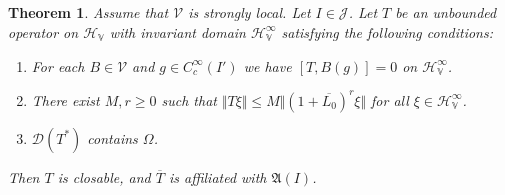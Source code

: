 \documentclass[12pt,b5paper,notitlepage]{article}
\theoremstyle{definition}
\theoremstyle{plain}
\newtheorem{thm}[df]{Theorem}
\newcommand{\fk}{\mathfrak}
\newcommand{\mc}{\mathcal}
\newcommand{\ovl}{\overline}
\newcommand{\Dom}{\scr{D}}
\newcommand{\scr}{\mathscr}
\newcommand{\HV}{\mathcal H_{\mathbb V}}
\newcommand{\MV}{\mathcal V}
\numberwithin{equation}{section}
\begin{document}
\subsection{}



\begin{thm}\label{lb106}
Assume that $\MV$ is strongly local. Let $I\in\mc J$. Let $T$ be an unbounded operator on $\HV$ with invariant domain $\HV^\infty$ satisfying the following conditions:
\begin{enumerate}[label=(\arabic*)]
\item For each $B\in\MV$ and $g\in C_c^\infty(I')$ we have $[T,B(g)]=0$ on $\HV^\infty$.
\item There exist $M,r\geq0$ such that $\Vert T\xi\Vert\leq M\Vert(1+\ovl{L_0})^r\xi\Vert$ for all $\xi\in\HV^\infty$. 
\item $\Dom(T^*)$ contains $\Omega$.
\end{enumerate}
Then $T$ is closable, and $\ovl T$ is affiliated with $\fk A(I)$.
\end{thm}
\end{document}
